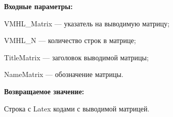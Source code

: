 \textbf{Входные параметры:}

VMHL\_Matrix --- указатель на выводимую матрицу;
 
VMHL\_N --- количество строк в матрице;
 
TitleMatrix --- заголовок выводимой матрицы;
 
NameMatrix --- обозначение матрицы.
	
\textbf{Возвращаемое значение:}

Строка с Latex кодами с выводимой матрицей.